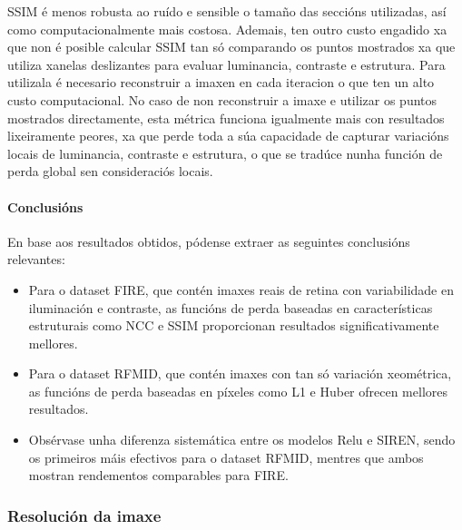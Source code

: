 SSIM é menos robusta ao ruído e sensible o tamaño das seccións utilizadas, así como computacionalmente mais costosa. Ademais, ten outro custo engadido xa que non é posible calcular SSIM tan só comparando os puntos mostrados xa que utiliza xanelas deslizantes para evaluar luminancia, contraste e estrutura. 
Para utilizala é necesario reconstruir a imaxen en cada iteracion o que ten un alto custo computacional.
No caso de non reconstruir a imaxe e utilizar os puntos mostrados directamente, esta métrica funciona igualmente mais con resultados lixeiramente peores, xa que perde toda a súa capacidade de capturar variacións locais de luminancia, contraste e estrutura, o que se tradúce nunha función de perda global sen consideraciós locais.



\paragraph{Conclusións}
\label{par:Conclusions-loss}

En base aos resultados obtidos, pódense extraer as seguintes conclusións relevantes:
\begin{itemize}
    \item Para o dataset FIRE, que contén imaxes reais de retina con variabilidade en iluminación e contraste, as funcións de perda baseadas en características estruturais como NCC e SSIM proporcionan resultados significativamente mellores.
    \item Para o dataset RFMID, que contén imaxes con tan só variación xeométrica, as funcións de perda baseadas en píxeles como L1 e Huber ofrecen mellores resultados.
    \item Obsérvase unha diferenza sistemática entre os modelos Relu e SIREN, sendo os primeiros máis efectivos para o dataset RFMID, mentres que ambos mostran rendementos comparables para FIRE.
\end{itemize}


\subsubsection{Resolución da imaxe}
\label{subsubsec:Resolución da imaxe}

